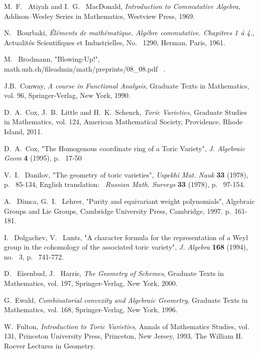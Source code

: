 \documentclass[BSc]{usydthesis}
\numberwithin{equation}{chapter}
\theoremstyle{remark}
\begin{document}
\begin{thebibliography}{10}

{\sc M.~F.~ Atiyah and I.~G.~ MacDonald}, {\em Introduction to Commutative Algebra}, Addison--Wesley Series in Mathematics, Westview Press, 1969.

{\sc N.~ Bourbaki}, {\em \'{E}l\'{e}ments de math\'{e}matique. Alg\'{e}bre commutative. Chapitres 1 \'{a} 4.}, Actualit\'{e}s Scientifiques et Industrielles, No.~ 1290, Herman, Paris, 1961.

{\sc M.~ Brodmann}, "Blowing-Up!", math.uzh.ch/fileadmin/math/preprints/08\_08.pdf ~. 

{\sc J.B.~Conway}, {\em A course in Functional Analysis}, Graduate Texts in Mathematics, vol. 96, Springer-Verlag, New York, 1990. 

{\sc D.~A.~Cox, J.~B.~Little and H.~K.~Schenck}, {\em Toric Varieties}, Graduate Studies in Mathematics, vol. 124, American Mathematical Society, Providence, Rhode Island, 2011.

{\sc D.~A.~Cox}, "The Homogenous coordinate ring of a Toric Variety", {\em J. Algebraic Geom} {\bf 4} (1995), p.~ 17-50

{\sc V.~I.~ Danilov}, "The geometry of toric varieties", {\em Uspekhi Mat. Nauk} {\bf 33} (1978), p.~ 85-134, English translation:~ {\em Russian Math. Surveys} {\bf 33} (1978), p.~ 97-154.

{\sc A.~ Dimca, G.~I.~ Lehrer}, "Purity and equivariant weight polynomials", Algebraic Groups and Lie Groups, Cambridge University Press, Cambridge, 1997. p.~161-181. 

{\sc I.~ Dolgachev, V.~ Lunts}, "A character formula for the representation of a Weyl group in the cohomology of the associated toric variety", {\em J. Algebra} {\bf 168} (1994), no.~ 3, p.~ 741-772.

{\sc D.~ Eisenbud, J.~ Harris}, {\em The Geometry of Schemes}, Graduate Texts in Mathematics, vol. 197, Springer-Verlag, New York, 2000. 

{\sc G.~Ewald}, {\em Combinatorial convexity and Algebraic Geometry}, Graduate Texts in Mathematics, vol. 168, Springer-Verlag, New York, 1996.

{\sc W.~Fulton}, {\em Introduction to Toric Varieties}, Annals of Mathematics Studies, vol. 131, Princeton University Press, Princeton, New Jersey, 1993, The William H. Roever Lectures in Geometry. 


\end{thebibliography}
\end{document}

